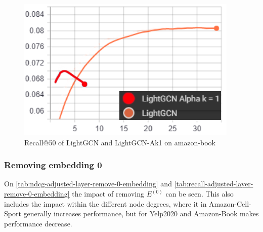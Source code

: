 \begin{figure}[h!]
    \includegraphics[width=\linewidth]{figures/alpha-k-results/amazon-recall.png}
    \caption{Recall@50 of LightGCN and LightGCN-Ak1 on amazon-book}
    \label{fig:recall-amazon-alpha-k}
\end{figure}

\subsubsection{Removing embedding 0}
On \autoref{tab:ndcg-adjusted-layer-remove-0-embedding} and \autoref{tab:recall-adjusted-layer-remove-0-embedding} the impact of removing $E^{(0)}$ can be seen.
This also includes the impact within the different node degrees, where it in Amazon-Cell-Sport generally increases performance, but for Yelp2020 and Amazon-Book makes performance decrease.

